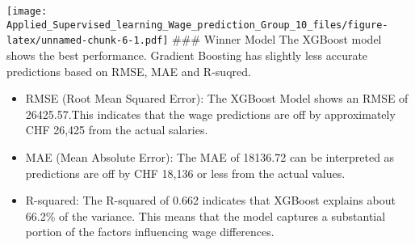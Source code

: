 \documentclass[
]{article}
\newenvironment{Shaded}{\begin{snugshade}}{\end{snugshade}}
\newcommand{\AttributeTok}[1]{\textcolor[rgb]{0.13,0.29,0.53}{#1}}
\newcommand{\CommentTok}[1]{\textcolor[rgb]{0.56,0.35,0.01}{\textit{#1}}}
\newcommand{\ControlFlowTok}[1]{\textcolor[rgb]{0.13,0.29,0.53}{\textbf{#1}}}
\newcommand{\DecValTok}[1]{\textcolor[rgb]{0.00,0.00,0.81}{#1}}
\newcommand{\FunctionTok}[1]{\textcolor[rgb]{0.13,0.29,0.53}{\textbf{#1}}}
\newcommand{\NormalTok}[1]{#1}
\newcommand{\OtherTok}[1]{\textcolor[rgb]{0.56,0.35,0.01}{#1}}
\newcommand{\SpecialCharTok}[1]{\textcolor[rgb]{0.81,0.36,0.00}{\textbf{#1}}}
\newcommand{\StringTok}[1]{\textcolor[rgb]{0.31,0.60,0.02}{#1}}
\providecommand{\tightlist}{%
  \setlength{\itemsep}{0pt}\setlength{\parskip}{0pt}}
\begin{document}
\begin{Shaded}
\end{Shaded}

\texttt{[image: Applied\_Supervised\_learning\_Wage\_prediction\_Group\_10\_files/figure-latex/unnamed-chunk-6-1.pdf]}
\#\#\# Winner Model The XGBoost model shows the best performance.
Gradient Boosting has slightly less accurate predictions based on RMSE,
MAE and R-suqred.

\begin{itemize}
\tightlist
\item
  RMSE (Root Mean Squared Error): The XGBoost Model shows an RMSE of
  26425.57.This indicates that the wage predictions are off by
  approximately CHF 26,425 from the actual salaries.
\item
  MAE (Mean Absolute Error): The MAE of 18136.72 can be interpreted as
  predictions are off by CHF 18,136 or less from the actual values.
\item
  R-squared: The R-squared of 0.662 indicates that XGBoost explains
  about 66.2\% of the variance. This means that the model captures a
  substantial portion of the factors influencing wage differences.
\end{itemize}
\end{document}
